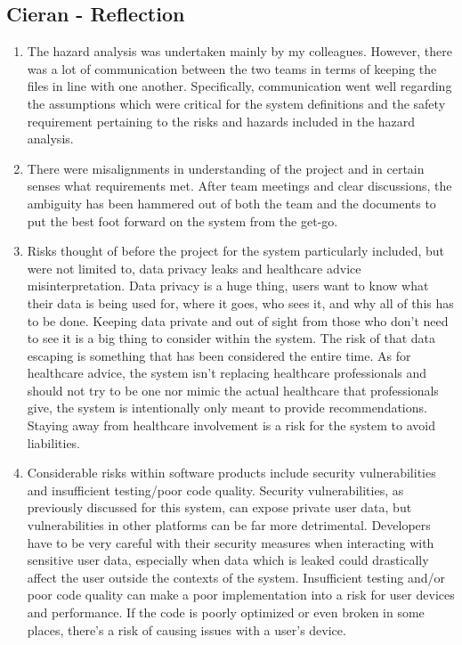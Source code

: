 \documentclass{article}
\begin{document}
\subsection*{Cieran - Reflection}
\begin{enumerate}
    \item The hazard analysis was undertaken mainly by my colleagues. However, there was a lot of communication between the two teams in terms of keeping the files in line with one another. Specifically, communication went well regarding the assumptions which were critical for the system definitions and the safety requirement pertaining to the risks and hazards included in the hazard analysis.
    \item There were misalignments in understanding of the project and in certain senses what requirements met. After team meetings and clear discussions, the ambiguity has been hammered out of both the team and the documents to put the best foot forward on the system from the get-go.
    \item Risks thought of before the project for the system particularly included, but were not limited to, data privacy leaks and healthcare advice misinterpretation. Data privacy is a huge thing, users want to know what their data is being used for, where it goes, who sees it, and why all of this has to be done. Keeping data private and out of sight from those who don’t need to see it is a big thing to consider within the system. The risk of that data escaping is something that has been considered the entire time. As for healthcare advice, the system isn’t replacing healthcare professionals and should not try to be one nor mimic the actual healthcare that professionals give, the system is intentionally only meant to provide recommendations. Staying away from healthcare involvement is a risk for the system to avoid liabilities.
    \item Considerable risks within software products include security vulnerabilities and insufficient testing/poor code quality. Security vulnerabilities, as previously discussed for this system, can expose private user data, but vulnerabilities in other platforms can be far more detrimental. Developers have to be very careful with their security measures when interacting with sensitive user data, especially when data which is leaked could drastically affect the user outside the contexts of the system. Insufficient testing and/or poor code quality can make a poor implementation into a risk for user devices and performance. If the code is poorly optimized or even broken in some places, there’s a risk of causing issues with a user’s device.
\end{enumerate}
\end{document}
